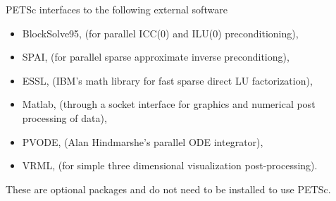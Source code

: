 \vspace{.3in}
PETSc interfaces to the following external software
\begin{itemize}
  \item BlockSolve95, (for parallel ICC(0) and ILU(0) preconditioning),
  \item SPAI,         (for parallel sparse approximate inverse preconditiong),
  \item ESSL,         (IBM's math library for fast sparse direct LU factorization),
  \item Matlab,       (through a socket interface for graphics and numerical post processing 
                       of data),
  \item PVODE,        (Alan Hindmarshe's parallel ODE integrator),
  \item VRML,         (for simple three dimensional visualization post-processing).
\end{itemize}
These are optional packages and do not need to be installed to use PETSc.


